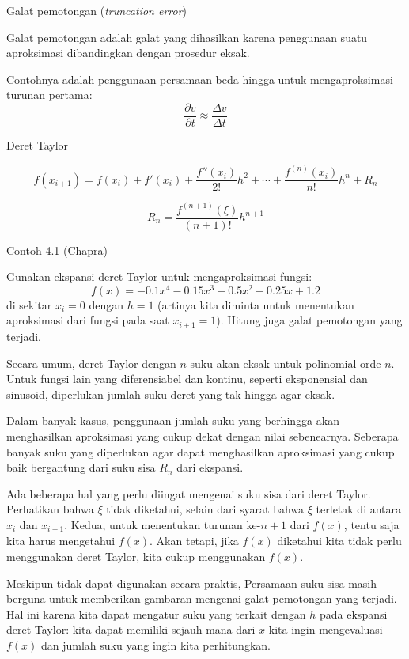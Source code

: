 \begin{frame}{Galat pemotongan (\textit{truncation error})}

Galat pemotongan adalah galat yang dihasilkan karena penggunaan
suatu aproksimasi dibandingkan dengan prosedur eksak.

Contohnya adalah penggunaan persamaan beda hingga untuk mengaproksimasi
turunan pertama:
$$
\frac{\partial v}{\partial t} \approx \frac{\Delta v}{\Delta t}
$$

\end{frame}



\begin{frame}{Deret Taylor}

\begin{equation}
f(x_{i+1}) = f(x_i) + f'(x_{i}) + \frac{f''(x_i)}{2!}h^2 + \cdots +
\frac{f^{(n)}(x_i)}{n!}h^n + R_{n}
\end{equation}

\begin{equation}
R_{n} = \frac{f^{(n+1)}(\xi)}{(n+1)!}h^{n+1}
\end{equation}

\end{frame}


\begin{frame}{Contoh 4.1 (Chapra)}

Gunakan ekspansi deret Taylor untuk mengaproksimasi fungsi:
$$
f(x) = -0.1 x^{4} - 0.15 x^{3} - 0.5 x^{2} - 0.25 x + 1.2
$$
di sekitar $x_{i} = 0$ dengan $h=1$ (artinya kita diminta untuk menentukan
aproksimasi dari fungsi pada saat $x_{i+1}=1$). Hitung juga galat pemotongan
yang terjadi.

\end{frame}


\begin{frame}
Secara umum, deret Taylor dengan $n$-suku akan eksak untuk polinomial
orde-$n$. Untuk fungsi lain yang diferensiabel dan kontinu, seperti eksponensial
dan sinusoid, diperlukan jumlah suku deret yang tak-hingga agar eksak.

Dalam banyak kasus, penggunaan jumlah suku yang berhingga akan menghasilkan
aproksimasi yang cukup dekat dengan nilai sebenearnya. Seberapa banyak suku
yang diperlukan agar dapat menghasilkan aproksimasi yang cukup baik bergantung
dari suku sisa $R_{n}$ dari ekspansi.

Ada beberapa hal yang perlu diingat mengenai suku sisa dari deret Taylor.
Perhatikan bahwa $\xi$ tidak diketahui, selain dari syarat bahwa $\xi$ terletak
di antara $x_{i}$ dan $x_{i+1}$. Kedua, untuk menentukan turunan ke-$n+1$ dari
$f(x)$, tentu saja kita harus mengetahui $f(x)$. Akan tetapi, jika $f(x)$ diketahui
kita tidak perlu menggunakan deret Taylor, kita cukup menggunakan $f(x)$.

Meskipun tidak dapat digunakan secara praktis, Persamaan suku sisa masih
berguna untuk memberikan gambaran mengenai galat pemotongan yang terjadi.
Hal ini karena kita dapat mengatur suku yang terkait dengan $h$ pada ekspansi
deret Taylor: kita dapat memiliki sejauh mana dari $x$ kita ingin mengevaluasi $f(x)$
dan jumlah suku yang ingin kita perhitungkan.
\end{frame}



